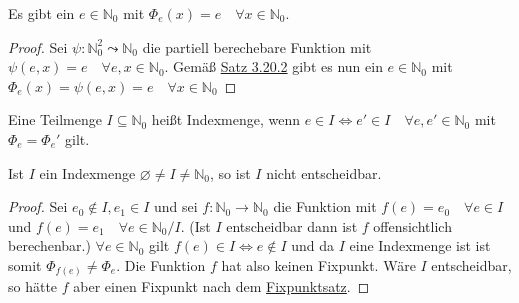   Es gibt ein $e \in \mathbb{N}_0$ mit $\Phi_e(x) = e \quad \forall x \in \mathbb{N}_0$.
  \begin{proof}
    Sei $\psi : \mathbb{N}_0^2 \leadsto \mathbb{N}_0$ die partiell berechebare Funktion mit $\psi(e, x) = e \quad \forall e, x \in \mathbb{N}_0$. Gemäß \hyperref[subsubsec:3.20.2]{Satz 3.20.2} gibt es nun ein $e \in \mathbb{N}_0$ mit $\Phi_e (x) = \psi (e,x) = e \quad \forall x \in \mathbb{N}_0$
  \end{proof}

  Eine Teilmenge $I \subseteq \mathbb{N}_0$ heißt Indexmenge, wenn $e \in I \Leftrightarrow e' \in I \quad \forall e, e' \in \mathbb{N}_0$ mit $\Phi_e = \Phi_e'$ gilt.

  Ist $I$ ein Indexmenge $\varnothing \not = I \not = \mathbb{N}_0$, so ist $I$ nicht entscheidbar.
  \begin{proof}
    Sei $e_0 \not \in I, e_1 \in I$ und sei $f: \mathbb{N}_0 \to \mathbb{N}_0$ die Funktion mit $f(e) = e_0 \quad \forall e \in I$ und $f(e) = e_1 \quad \forall e \in \mathbb{N}_0 / I$. (Ist $I$ entscheidbar dann ist $f$ offensichtlich berechenbar.) $\forall e \in \mathbb{N}_0$ gilt $f(e) \in I \Leftrightarrow e \not \in I$ und da $I$ eine Indexmenge ist ist somit $\Phi_{f(e)} \not = \Phi_e$. Die Funktion $f$ hat also keinen Fixpunkt. Wäre $I$ entscheidbar, so hätte $f$ aber einen Fixpunkt nach dem \hyperref[subsubsec:3.20.1]{Fixpunktsatz}.
  \end{proof}